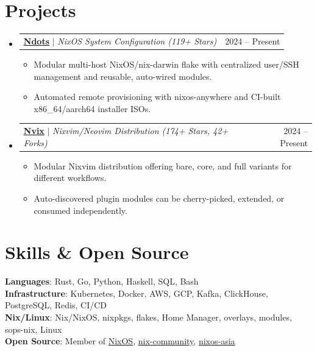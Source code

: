 \documentclass[letterpaper,12pt]{article}
\makeatletter
\newcommand{\resumeItem}[1]{
  \item \small\justifying #1
}
\newcommand{\resumeProjectHeading}[2]{
    \vspace{0pt}\item
    \begin{tabular*}{0.97\textwidth}{l@{\extracolsep{\fill}}r}
      \small#1 & #2 \\
    \end{tabular*}\vspace{-3pt}
}
\newcommand{\resumeSubHeadingListStart}{\begin{itemize}[leftmargin=0.15in, label={}]}
\newcommand{\resumeSubHeadingListEnd}{\end{itemize}}
\newenvironment{tightItemList}{\begin{itemize}[topsep=1pt, partopsep=0pt, parsep=1pt, itemsep=1pt]\justifying}{\end{itemize}\vspace{-5pt}}
\makeatother
\begin{document}
\vspace{-8pt}
\section{Projects}
\resumeSubHeadingListStart
\resumeProjectHeading
{\textbf{\href{https://github.com/semi710/ndots}{Ndots}} $|$ \emph{NixOS System Configuration (119+ Stars)}}{2024 -- Present}
\begin{tightItemList}
\resumeItem{Modular multi-host NixOS/nix-darwin flake with centralized user/SSH management and reusable, auto-wired modules.}
\resumeItem{Automated remote provisioning with nixos-anywhere and CI-built x86\_64/aarch64 installer ISOs.}
\end{tightItemList}

\resumeProjectHeading
{\textbf{\href{https://github.com/semi710/nvix}{Nvix}} $|$ \emph{Nixvim/Neovim Distribution (174+ Stars, 42+ Forks)}}{2024 -- Present}
\begin{tightItemList}
\resumeItem{Modular Nixvim distribution offering bare, core, and full variants for different workflows.}
\resumeItem{Auto-discovered plugin modules can be cherry-picked, extended, or consumed independently.}
\end{tightItemList}
\resumeSubHeadingListEnd

\vspace{-6pt}
\section{Skills \& Open Source}
\vspace{-4pt}
\begin{itemize}[leftmargin=0.15in, label={}, nosep, topsep=0pt, itemsep=0pt, parsep=0pt]
\small{\item{
\textbf{Languages}{: Rust, Go, Python, Haskell, SQL, Bash} \\
\textbf{Infrastructure}{: Kubernetes, Docker, AWS, GCP, Kafka, ClickHouse, PostgreSQL, Redis, CI/CD} \\
\textbf{Nix/Linux}{: Nix/NixOS, nixpkgs, flakes, Home Manager, overlays, modules, sops-nix, Linux} \\
\textbf{Open Source}{: Member of \href{https://github.com/NixOS}{NixOS}, \href{https://github.com/nix-community}{nix-community}, \href{https://github.com/nixos-asia}{nixos-asia}}
}}
\end{itemize}
\vspace{-8pt}
\end{document}
